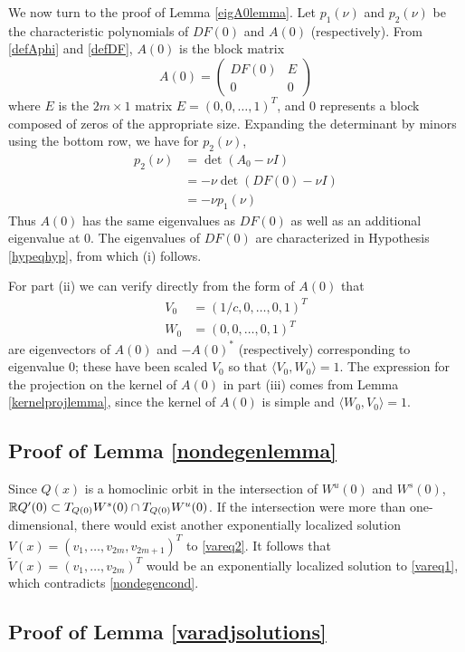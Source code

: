\documentclass[thesis.tex]{subfiles}
\begin{document}
We now turn to the proof of Lemma \ref{eigA0lemma}. Let $p_1(\nu)$ and $p_2(\nu)$ be the characteristic polynomials of $DF(0)$ and $A(0)$ (respectively). From \eqref{defAphi} and \eqref{defDF}, $A(0)$ is the block matrix
\[
A(0) = \begin{pmatrix}
DF(0) & E \\
0 & 0
\end{pmatrix}
\]
where $E$ is the $2m \times 1$ matrix $E = (0, 0, \dots, 1)^T$, and $0$ represents a block composed of zeros of the appropriate size. Expanding the determinant by minors using the bottom row, we have for $p_2(\nu)$,
\begin{align*}
p_2(\nu) &= \det(A_0 - \nu I) \\
&= -\nu \det(DF(0) - \nu I) \\
&= -\nu p_1(\nu)
\end{align*}
Thus $A(0)$ has the same eigenvalues as $DF(0)$ as well as an additional eigenvalue at 0. The eigenvalues of $DF(0)$ are characterized in Hypothesis \ref{hypeqhyp}, from which (i) follows.

For part (ii) we can verify directly from the form of $A(0)$ that 
\begin{align*}
V_0 &= (1/c, 0, \dots, 0, 1)^T \\
W_0 &= (0, 0, \dots, 0, 1)^T
\end{align*}
are eigenvectors of $A(0)$ and $-A(0)^*$ (respectively) corresponding to eigenvalue 0; these have been scaled $V_0$ so that $\langle V_0, W_0 \rangle = 1$. The expression for the projection on the kernel of $A(0)$ in part (iii) comes from Lemma \ref{kernelprojlemma}, since the kernel of $A(0)$ is simple and $\langle W_0, V_0 \rangle = 1$.

\subsection{Proof of Lemma \ref{nondegenlemma}}
Since $Q(x)$ is a homoclinic orbit in the intersection of $W^u(0)$ and $W^s(0)$, $\mathbb{R} Q'(0) \subset T_{Q(0)}W^s(0) \cap T_{Q(0)}W^u(0)$. If the intersection were more than one-dimensional, there would exist another exponentially localized solution $V(x) = (v_1, \dots, v_{2m}, v_{2m+1})^T$ to \eqref{vareq2}. It follows that $\tilde{V}(x) = (v_1, \dots, v_{2m})^T$ would be an exponentially localized solution to \eqref{vareq1}, which contradicts \eqref{nondegencond}.

\subsection{Proof of Lemma \ref{varadjsolutions}}
\end{document}

